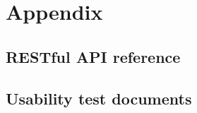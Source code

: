 \newpage
\appendix

\section{Appendix}

\subsection{RESTful API reference}

\subsection{Usability test documents}